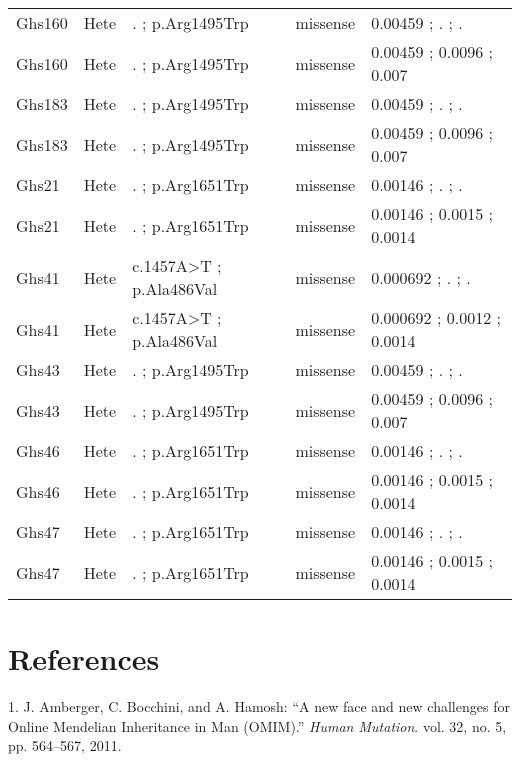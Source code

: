 \documentclass[12pt,twoside]{reedthesis}
\theoremstyle{definition}
\theoremstyle{definition}
\theoremstyle{remark}
\begin{document}
\begin{landscape}
\begin{longtable}[t]{lllll}
  Ghs160 & Hete & . ; p.Arg1495Trp & missense & 0.00459 ; . ; .\\
  \addlinespace
  Ghs160 & Hete & . ; p.Arg1495Trp & missense & 0.00459 ; 0.0096 ; 0.007\\
  Ghs183 & Hete & . ; p.Arg1495Trp & missense & 0.00459 ; . ; .\\
  Ghs183 & Hete & . ; p.Arg1495Trp & missense & 0.00459 ; 0.0096 ; 0.007\\
  Ghs21 & Hete & . ; p.Arg1651Trp & missense & 0.00146 ; . ; .\\
  Ghs21 & Hete & . ; p.Arg1651Trp & missense & 0.00146 ; 0.0015 ; 0.0014\\
  \addlinespace
  Ghs41 & Hete & c.1457A>T ; p.Ala486Val & missense & 0.000692 ; . ; .\\
  Ghs41 & Hete & c.1457A>T ; p.Ala486Val & missense & 0.000692 ; 0.0012 ; 0.0014\\
  Ghs43 & Hete & . ; p.Arg1495Trp & missense & 0.00459 ; . ; .\\
  Ghs43 & Hete & . ; p.Arg1495Trp & missense & 0.00459 ; 0.0096 ; 0.007\\
  Ghs46 & Hete & . ; p.Arg1651Trp & missense & 0.00146 ; . ; .\\
  \addlinespace
  Ghs46 & Hete & . ; p.Arg1651Trp & missense & 0.00146 ; 0.0015 ; 0.0014\\
  Ghs47 & Hete & . ; p.Arg1651Trp & missense & 0.00146 ; . ; .\\
  Ghs47 & Hete & . ; p.Arg1651Trp & missense & 0.00146 ; 0.0015 ; 0.0014\\
  \bottomrule
  \end{longtable}
  \end{landscape}
  
  \backmatter
  
  \chapter*{References}\label{references}
  
  \noindent
  
  \setlength{\parindent}{-0.20in} \setlength{\leftskip}{0.20in}
  \setlength{\parskip}{8pt}
  
  \hypertarget{refs}{}
  \hypertarget{ref-Amberger2011}{}
  1. J. Amberger, C. Bocchini, and A. Hamosh: ``A new face and new
  challenges for Online Mendelian Inheritance in Man (OMIM).'' \emph{Human
  Mutation}. vol. 32, no. 5, pp. 564--567, 2011.
  
\end{document}
